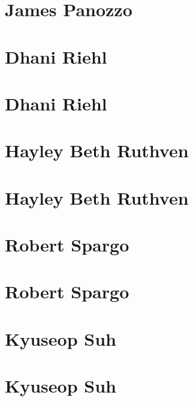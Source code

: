 \documentclass[twoside,14pt,a4paper,notitlepage]{memoir}
\begin{document}
\lipsum[1-2]
\section*{James Panozzo}
\lipsum[3]



\section*{Dhani Riehl}
\label{aut:riehl}

\lipsum[1-2]
\section*{Dhani Riehl}
\lipsum[3]



\section*{Hayley Beth Ruthven}
\label{aut:ruthven}

\lipsum[1-2]
\section*{Hayley Beth Ruthven}
\lipsum[3]



\section*{Robert Spargo}
\label{aut:spargo}

\lipsum[1-2]
\section*{Robert Spargo}
\lipsum[3]



\section*{Kyuseop Suh}
\label{aut:suh}

\lipsum[1-2]
\section*{Kyuseop Suh}
\lipsum[3]
\end{document}

